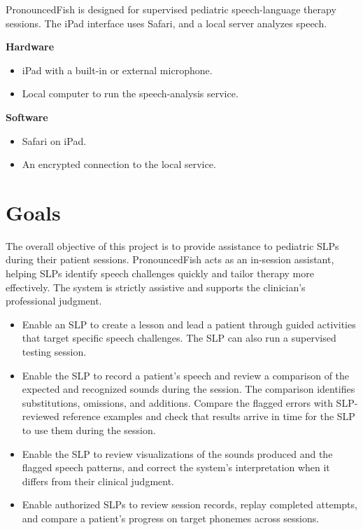 \documentclass{article}
\begin{document}
PronouncedFish is designed for supervised pediatric speech-language therapy
sessions. The iPad interface uses Safari, and a local server analyzes speech.

\noindent\textbf{Hardware}
\begin{itemize}
    \item iPad with a built-in or external microphone.
    \item Local computer to run the speech-analysis service.
\end{itemize}

\noindent\textbf{Software}
\begin{itemize}
    \item Safari on iPad.
    \item An encrypted connection to the local service.
\end{itemize}

\section{Goals}

The overall objective of this project is to provide assistance to pediatric
SLPs during their patient sessions. PronouncedFish acts as an in-session
assistant, helping SLPs identify speech challenges quickly and tailor therapy
more effectively. The system is strictly assistive and supports the
clinician's professional judgment.

\begin{itemize}
    \item Enable an SLP to create a lesson and lead a patient through guided
      activities that target specific speech challenges. The SLP can also
      run a supervised testing session.
    \item Enable the SLP to record a patient's speech and review a
      comparison of the expected and recognized sounds during the session.
      The comparison identifies substitutions, omissions, and additions.
      Compare the flagged errors with SLP-reviewed reference examples and
      check that results arrive in time for the SLP to use them during the
      session.
    \item Enable the SLP to review visualizations of the sounds produced and
      the flagged speech patterns, and correct the system's interpretation
      when it differs from their clinical judgment.
    \item Enable authorized SLPs to review session records, replay completed
      attempts, and compare a patient's progress on target phonemes across
      sessions.
\end{itemize}
\end{document}
